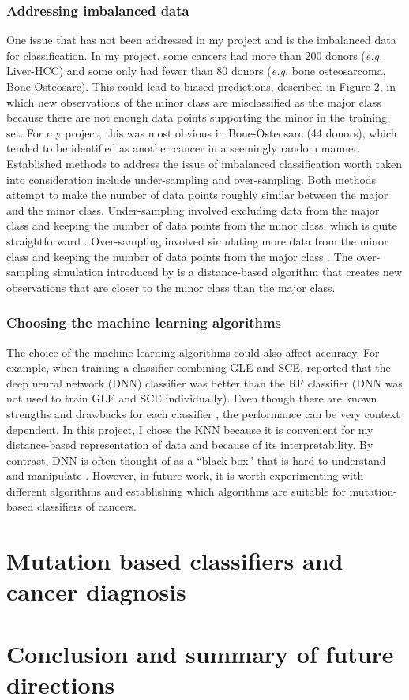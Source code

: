 \subsubsection{Addressing imbalanced data}
One issue that has not been addressed in my project and \citet{Jiao2020} is the imbalanced data for classification. In my project, some cancers had more than 200 donors (\textit{e.g.} Liver-HCC) and some only had fewer than 80 donors (\textit{e.g.} bone osteosarcoma, Bone-Osteosarc). This could lead to biased predictions, described in Figure \ref{}, in which new observations of the minor class are misclassified as the major class because there are not enough data points supporting the minor in the training set. For my project, this was most obvious in Bone-Osteosarc (44 donors), which tended to be identified as another cancer in a seemingly random manner. Established methods to address the issue of imbalanced classification worth taken into consideration include under-sampling and over-sampling. Both methods attempt to make the number of data points roughly similar between the major and the minor class. Under-sampling involved excluding data from the major class and keeping the number of data points from the minor class, which is quite straightforward \citep{Kubat1997AddressingSelection}. Over-sampling involved simulating more data from the minor class and keeping the number of data points from the major class \citep{Chawla2002SMOTE:Technique}. The over-sampling simulation introduced by \citet{Chawla2002SMOTE:Technique} is a distance-based algorithm that creates new observations that are closer to the minor class than the major class. 



\subsubsection{Choosing the machine learning algorithms}
The choice of the machine learning algorithms could also affect accuracy. For example, when training a classifier combining GLE and SCE, \citet{Jiao2020} reported that the deep neural network (DNN) classifier was better than the RF classifier (DNN was not used to train GLE and SCE individually). Even though there are known strengths and drawbacks for each classifier \citep{Susmita2019AAlgorithms}, the performance can be very context dependent. In this project, I chose the KNN because it is convenient for my distance-based representation of data and because of its interpretability. By contrast, DNN is often thought of as a ``black box'' that is hard to understand and manipulate \citep{Shwartz-Ziv2017OpeningInformation}. However, in future work, it is worth experimenting with different algorithms and establishing which algorithms are suitable for mutation-based classifiers of cancers. 

\section{Mutation based classifiers and cancer diagnosis}

\section{Conclusion and summary of future directions}